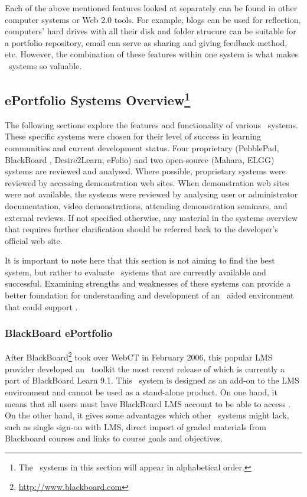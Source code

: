 Each of the above mentioned features looked at separately can be found in other
computer systems or Web 2.0 tools. For example, blogs can be used for
reflection, computers' hard drives with all their disk and folder strucure can
be suitable for a portfolio repository, email can serve as sharing and giving
feedback method, etc. However, the combination of these features within one
system is what makes \ep~systems so valuable.

\subsection[ePortfolio Systems Overview]{ePortfolio Systems
Overview\footnote{The \ep~systems in this section will appear in alphabetical
order.}} 
The following sections explore the features and functionality of various
\ep~systems. These specific systems were chosen for their level of success in
learning communities and current development status. Four proprietary
(PebblePad, BlackBoard \ep, Desire2Learn, eFolio) and two open-source (Mahara,
ELGG) systems are reviewed and analysed. Where possible, proprietary systems
were reviewed by accessing demonstration web sites. When demonstration web
sites were not available, the systems were reviewed by analysing user or
administrator documentation, video demonstrations, attending demonstration
seminars, and external reviews. If not specified otherwise, any material in
the systems overview that requires further clarification should be referred back
to the developer's official web site.

It is important to note here that this section is not aiming to find the best
system, but rather to evaluate \ep~systems that are currently available and
successful. Examining strengths and weaknesses of these systems can provide a
better foundation for understanding and development of an \ep~aided environment
that could support \LLLsn.

\subsubsection{BlackBoard ePortfolio}
After BlackBoard\footnote{\url{http://www.blackboard.com}} took over WebCT in
February 2006, this popular LMS provider developed an \ep~toolkit the most
recent release of which is currently a part of BlackBoard Learn 9.1. This
\ep~system is designed as an add-on to the LMS environment and cannot be used
as a stand-alone product. On one hand, it means that all users must have
BlackBoard LMS account to be able to access \ep. On the other hand, it gives
some advantages which other \ep~systems might lack, such as single sign-on with
LMS, direct import of graded materials from Blackboard courses and links to
course goals and objectives.

